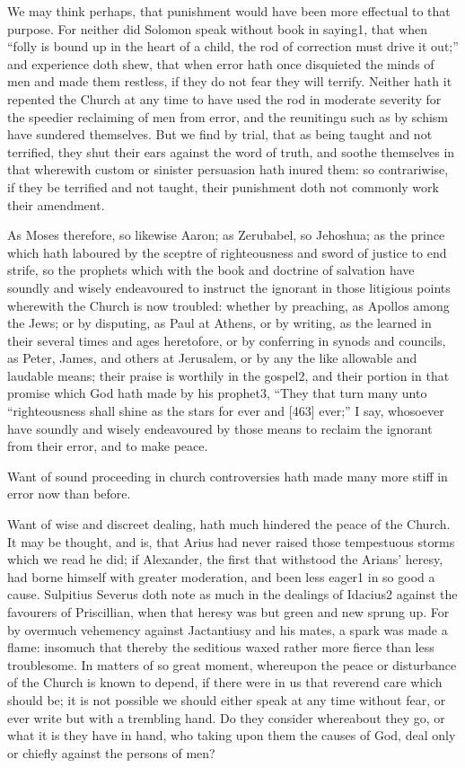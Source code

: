 We may think perhaps, that punishment would have been more effectual to that purpose. For neither did Solomon speak without book in saying1, that when “folly is bound up in the heart of a child, the rod of correction must drive it out;” and experience doth shew, that when error hath once disquieted the minds of men and made them restless, if they do not fear they will terrify. Neither hath it repented the Church at any time to have used the rod in moderate severity for the speedier reclaiming of men from error, and the reunitingu such as by schism have sundered themselves. But we find by trial, that as being taught and not terrified, they shut their ears against the word of truth, and soothe themselves in that wherewith custom or sinister persuasion hath inured them: so contrariwise, if they be terrified and not taught, their punishment doth not commonly work their amendment.

As Moses therefore, so likewise Aaron; as Zerubabel, so Jehoshua; as the prince which hath laboured by the sceptre of righteousness and sword of justice to end strife, so the prophets which with the book and doctrine of salvation have soundly and wisely endeavoured to instruct the ignorant in those litigious points wherewith the Church is now troubled: whether by preaching, as Apollos among the Jews; or by disputing, as Paul at Athens, or by writing, as the learned in their several times and ages heretofore, or by conferring in synods and councils, as Peter, James, and others at Jerusalem, or by any the like allowable and laudable means; their praise is worthily in the gospel2, and their portion in that promise which God hath made by his prophet3, “They that turn many unto “righteousness shall shine as the stars for ever and [463] ever;” I say, whosoever have soundly and wisely endeavoured by those means to reclaim the ignorant from their error, and to make peace.

Want of sound proceeding in church controversies hath made many more stiff in error now than before.

Want of wise and discreet dealing, hath much hindered the peace of the Church. It may be thought, and is, that Arius had never raised those tempestuous storms which we read he did; if Alexander, the first that withstood the Arians’ heresy, had borne himself with greater moderation, and been less eager1 in so good a cause. Sulpitius Severus doth note as much in the dealings of Idacius2 against the favourers of Priscillian, when that heresy was but green and new sprung up. For by overmuch vehemency against Jactantiusy and his mates, a spark was made a flame: insomuch that thereby the seditious waxed rather more fierce than less troublesome. In matters of so great moment, whereupon the peace or disturbance of the Church is known to depend, if there were in us that reverend care which should be; it is not possible we should either speak at any time without fear, or ever write but with a trembling hand. Do they consider whereabout they go, or what it is they have in hand, who taking upon them the causes of God, deal only or chiefly against the persons of men?

